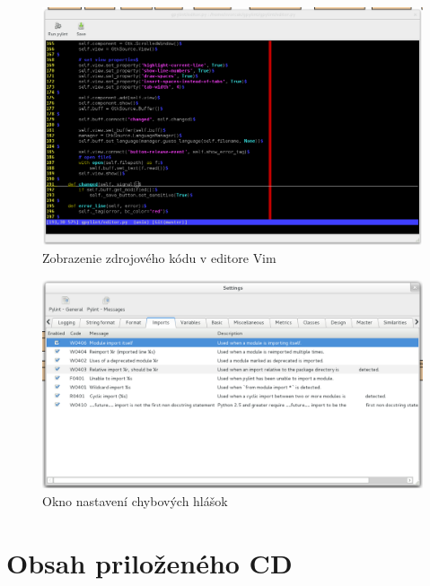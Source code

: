\documentclass[11pt,oneside,final]{fithesis2}
\begin{document}
	\begin{figure}[htb]
	 \centering
	 \includegraphics[width=\textwidth]{images/vim_editor}
	 \caption{Zobrazenie zdrojového kódu v editore Vim}
	\end{figure}
	
	\begin{figure}[htb]
	 \centering
	 \includegraphics[width=\textwidth]{images/settings}
	 \caption{Okno nastavení chybových hlášok}
	\end{figure}
		
\chapter{Obsah priloženého CD}
\end{document}
